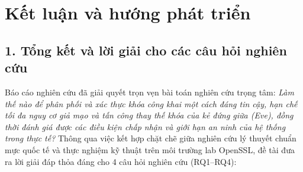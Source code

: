 \chapter*{Kết luận và hướng phát triển}
\label{chap:ket-luan}

\section*{1. Tổng kết và lời giải cho các câu hỏi nghiên cứu}

Báo cáo nghiên cứu đã giải quyết trọn vẹn bài toán nghiên cứu trọng tâm: \textit{Làm thế nào để phân phối và xác thực khóa công khai một cách đáng tin cậy, hạn chế tối đa nguy cơ giả mạo và tấn công thay thế khóa của kẻ đứng giữa (Eve), đồng thời đánh giá được các điều kiện chấp nhận và giới hạn an ninh của hệ thống trong thực tế?} Thông qua việc kết hợp chặt chẽ giữa nghiên cứu lý thuyết chuẩn mực quốc tế và thực nghiệm kỹ thuật trên môi trường lab OpenSSL, đề tài đưa ra lời giải đáp thỏa đáng cho 4 câu hỏi nghiên cứu (RQ1--RQ4):

